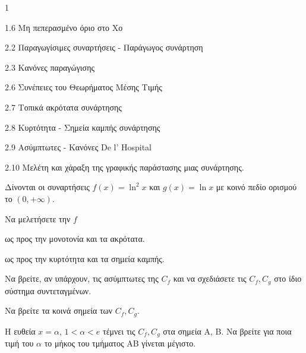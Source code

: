 \begin{ylh}{1}
    \item 1.6 Μη πεπερασμένο όριο στο Χο
    \item 2.2 Παραγωγίσιμες συναρτήσεις - Παράγωγος συνάρτηση
    \item 2.3 Κανόνες παραγώγισης
    \item 2.6 Συνέπειες του Θεωρήματος Μέσης Τιμής
    \item 2.7 Τοπικά ακρότατα συνάρτησης
    \item 2.8 Κυρτότητα - Σημεία καμπής συνάρτησης
    \item 2.9 Ασύμπτωτες - Κανόνες De l’ Hospital
    \item 2.10 Μελέτη και χάραξη της γραφικής παράστασης μιας συνάρτησης.
\end{ylh}
Δίνονται οι συναρτήσεις $f(x)=\ln^2x$ και $g(x)=\ln x$ με κοινό πεδίο ορισμού το $(0, +\infty)$.
\begin{alist}
\item Να μελετήσετε την $f$
    \begin{rlist}
    \item ως προς την μονοτονία και τα ακρότατα. 
    \item ως προς την κυρτότητα και τα σημεία καμπής. 
    \end{rlist}
\item Να βρείτε, αν υπάρχουν, τις ασύμπτωτες της $C_f$ και να σχεδιάσετε τις $C_f, C_g$ στο ίδιο σύστημα συντεταγμένων. 
\item \begin{rlist}
    \item Να βρείτε τα κοινά σημεία των $C_f, C_g$. 
    \item Η ευθεία $x=\alpha$, $1<\alpha<e$ τέμνει τις $C_f, C_g$ στα σημεία A, B. Να βρείτε για ποια τιμή του $\alpha$ το μήκος του τμήματος AB γίνεται μέγιστο. 
    \end{rlist}
\end{alist}